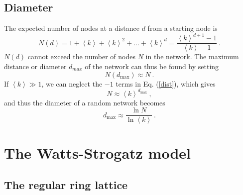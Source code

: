 \documentclass[11 pt , letterpaper , twoside , openright]{book}
\begin{document}
\subsection{Diameter}\label{ERdist}
The expected number of nodes at a distance $d$ from a starting node is \cite{Albert2014}
\begin{equation}\label{dist}
	N(d) = 1 + \left<k\right> + \left<k\right>^2 + ... + \left<k\right>^d = \frac{\left<k\right>^{d+1} - 1}{\left<k\right> - 1} \ .
\end{equation}
$N(d)$ cannot exceed the number of nodes $N$ in the network. The maximum distance or diameter $d_{max}$ of the network can thus be found by setting \cite{Albert2014}
\begin{equation}
	N(d_{\textrm{max}}) \approx N \ .
\end{equation}
If $\left<k\right> \gg 1$, we can neglect the $-1$ terms in Eq. (\ref{dist}), which gives \cite{Albert2014}
\begin{equation}
	N \approx \left<k\right>^{d_{\textrm{max}}} \ ,
\end{equation}
and thus the diameter of a random network becomes \cite{Albert2014}
\begin{equation}
	d_{\textrm{max}} \approx \frac{\ln{N}}{\ln{\left<k\right>}} \ .
\end{equation} 

\section{The Watts-Strogatz model}\label{WS}
\subsection{The regular ring lattice}\label{ringclus}
\end{document}
